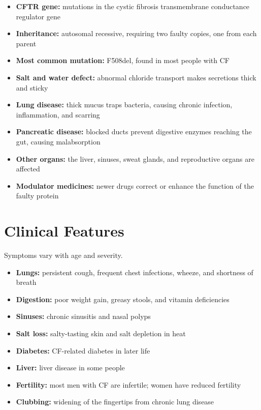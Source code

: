 \begin{itemize}
    \item \textbf{CFTR gene:} mutations in the cystic fibrosis transmembrane conductance regulator gene
    \item \textbf{Inheritance:} autosomal recessive, requiring two faulty copies, one from each parent
    \item \textbf{Most common mutation:} F508del, found in most people with CF
    \item \textbf{Salt and water defect:} abnormal chloride transport makes secretions thick and sticky
    \item \textbf{Lung disease:} thick mucus traps bacteria, causing chronic infection, inflammation, and scarring
    \item \textbf{Pancreatic disease:} blocked ducts prevent digestive enzymes reaching the gut, causing malabsorption
    \item \textbf{Other organs:} the liver, sinuses, sweat glands, and reproductive organs are affected
    \item \textbf{Modulator medicines:} newer drugs correct or enhance the function of the faulty protein
\end{itemize}

\section*{Clinical Features}
Symptoms vary with age and severity.

\begin{itemize}
    \item \textbf{Lungs:} persistent cough, frequent chest infections, wheeze, and shortness of breath
    \item \textbf{Digestion:} poor weight gain, greasy stools, and vitamin deficiencies
    \item \textbf{Sinuses:} chronic sinusitis and nasal polyps
    \item \textbf{Salt loss:} salty-tasting skin and salt depletion in heat
    \item \textbf{Diabetes:} CF-related diabetes in later life
    \item \textbf{Liver:} liver disease in some people
    \item \textbf{Fertility:} most men with CF are infertile; women have reduced fertility
    \item \textbf{Clubbing:} widening of the fingertips from chronic lung disease
\end{itemize}


